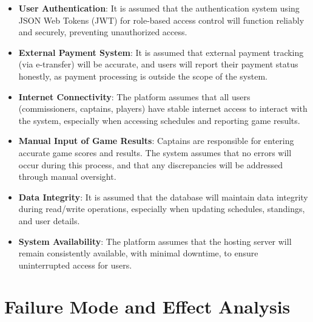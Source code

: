 \documentclass{article}
\begin{document}
\begin{itemize}
    \item \textbf{User Authentication}: It is assumed that the authentication system using JSON Web Tokens (JWT) for role-based access control will function reliably and securely, preventing unauthorized access.
    \item \textbf{External Payment System}: It is assumed that external payment tracking (via e-transfer) will be accurate, and users will report their payment status honestly, as payment processing is outside the scope of the system.
    \item \textbf{Internet Connectivity}: The platform assumes that all users (commissioners, captains, players) have stable internet access to interact with the system, especially when accessing schedules and reporting game results.
    \item \textbf{Manual Input of Game Results}: Captains are responsible for entering accurate game scores and results. The system assumes that no errors will occur during this process, and that any discrepancies will be addressed through manual oversight.
    \item \textbf{Data Integrity}: It is assumed that the database will maintain data integrity during read/write operations, especially when updating schedules, standings, and user details.
    \item \textbf{System Availability}: The platform assumes that the hosting server will remain consistently available, with minimal downtime, to ensure uninterrupted access for users.
\end{itemize}

\section{Failure Mode and Effect Analysis}

\end{document}
